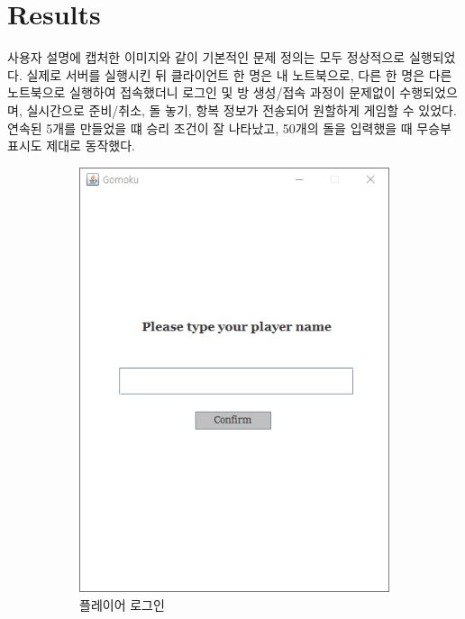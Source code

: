 \documentclass[a4paper, 10pt]{article}
\begin{document}
\section{Results}
사용자 설명에 캡처한 이미지와 같이 기본적인 문제 정의는 모두 정상적으로 실행되었다.
실제로 서버를 실행시킨 뒤 클라이언트 한 명은 내 노트북으로, 다른 한 명은 다른 노트북으로
실행하여 접속했더니 로그인 및 방 생성/접속 과정이 문제없이 수행되었으며,
실시간으로 준비/취소, 돌 놓기, 항복 정보가 전송되어 원할하게 게임할
수 있었다. 연속된 5개를 만들었을 떄 승리 조건이 잘 나타났고, 50개의 돌을 입력했을 때
무승부 표시도 제대로 동작했다.
\begin{figure}[h]
  \centering
  \begin{subfigure}{.3\textwidth}
    \centering
    \includegraphics[width=.8\linewidth]{resource/login}
    \caption{플레이어 로그인}
    \label{fig:login}
  \end{subfigure}
  \begin{subfigure}{.3\textwidth}
    \centering

\end{subfigure}
\end{figure}
\end{document}
